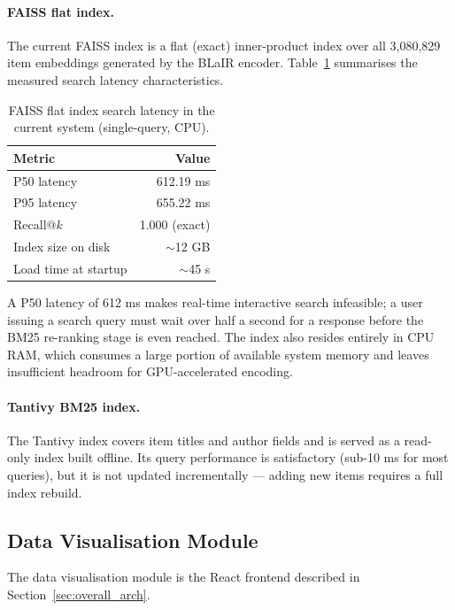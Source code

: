\paragraph{FAISS flat index.}
The current FAISS index is a flat (exact) inner-product index over all 3{,}080{,}829 item embeddings generated by the BLaIR encoder.
Table~\ref{tab:prior_faiss_latency} summarises the measured search latency characteristics.

\begin{table}[H]
\centering
\caption{FAISS flat index search latency in the current system (single-query, CPU).}
\label{tab:prior_faiss_latency}
\begin{tabular}{lr}
\hline
\textbf{Metric} & \textbf{Value} \\
\hline
P50 latency & 612.19 ms \\
P95 latency & 655.22 ms \\
Recall@$k$ & 1.000 (exact) \\
Index size on disk & $\sim$12 GB \\
Load time at startup & $\sim$45 s \\
\hline
\end{tabular}
\end{table}

A P50 latency of 612 ms makes real-time interactive search infeasible; a user issuing a search query must wait over half a second for a response before the BM25 re-ranking stage is even reached.
The index also resides entirely in CPU RAM, which consumes a large portion of available system memory and leaves insufficient headroom for GPU-accelerated encoding.

\paragraph{Tantivy BM25 index.}
The Tantivy index covers item titles and author fields and is served as a read-only index built offline.
Its query performance is satisfactory (sub-10 ms for most queries), but it is not updated incrementally — adding new items requires a full index rebuild.

\subsection{Data Visualisation Module}
\label{sec:viz_analysis}

The data visualisation module is the React frontend described in Section~\ref{sec:overall_arch}.

